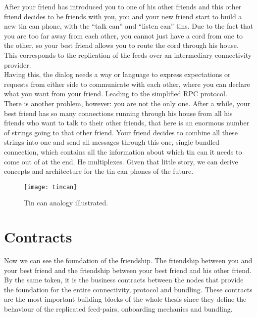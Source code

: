After your friend has introduced you to one of his other friends and this other friend decides to be friends with you, you and your new friend start to build a new tin can phone, with the “talk can” and “listen can” tins. Due to the fact that you are too far away from each other, you cannot just have a cord from one to the other, so your best friend allows you to route the cord through his house. This corresponds to the replication of the feeds over an intermediary connectivity provider.
\\

Having this, the dialog needs a way or language to express expectations or requests from either side to communicate with each other, where you can declare what you want from your friend. Leading to the simplified RPC protocol.\\ 

There is another problem, however: you are not the only one. After a while, your best friend has so many connections running through his house from all his friends who want to talk to their other friends, that here is an enormous number of strings going to that other friend. Your friend decides to combine all these strings into one and send all messages through this one, single bundled connection, which contains all the information about which tin can it needs to come out of at the end. He multiplexes. Given that little story, we can derive concepts and architecture for the tin can phones of the future.

\begin{figure}
    \centering
    \texttt{[image: tincan]}
    \caption{Tin can analogy illustrated.}
    \label{fig:tincan}
\end{figure}

\section{Contracts}
Now we can see the foundation of the friendship. The friendship between you and your best friend and the friendship between your best friend and his other friend. By the same token, it is the business contracts between the nodes that provide the foundation for the entire connectivity, protocol and bundling. These contracts are the most important building blocks of the whole thesis since they define the behaviour of the replicated feed-pairs, onboarding mechanics and bundling.

